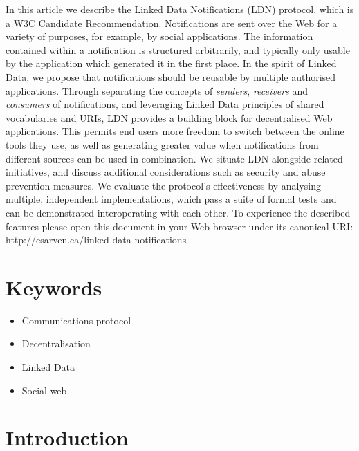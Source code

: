                           
\par In this article we describe the Linked Data Notifications (LDN) protocol, which is a \empty W3C Candidate Recommendation. Notifications are sent over the Web for a variety of purposes, for example, by social applications. The information contained within a notification is structured arbitrarily, and typically only usable by the application which generated it in the first place. In the spirit of Linked Data, we propose that notifications should be reusable by multiple authorised applications. Through separating the concepts of {\em senders}, {\em receivers} and {\em consumers} of notifications, and leveraging Linked Data principles of shared vocabularies and URIs, LDN provides a building block for decentralised Web applications. This permits end users more freedom to switch between the online tools they use, as well as generating greater value when notifications from different sources can be used in combination. We situate LDN alongside related initiatives, and discuss additional considerations such as security and abuse prevention measures. We evaluate the protocol’s effectiveness by analysing multiple, independent implementations, which pass a suite of formal tests and can be demonstrated interoperating with each other. To experience the described features please open this document in your Web browser under its canonical URI: http://csarven.ca/linked-data-notifications
                        
                    

                    
                        \section{Keywords}
  \label{keywords}

                        
                            \begin{itemize}
  \item \empty Communications protocol\item \empty Decentralisation\item \empty Linked Data\item \empty Social web
    \end{itemize}
  
                        
                    

                    
                        \section{Introduction}
  \label{introduction}

